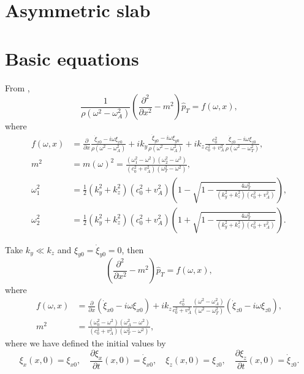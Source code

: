 \documentclass[12pt]{../style-files/ociamthesis}
\begin{document}
\section{Asymmetric slab}
\label{sec: IVP slab}


\section{Basic equations}
From \cite{and_etal07},
\begin{equation}
\frac{1}{\rho(\omega^2 - \omega_A^2)} \left( \frac{\partial^2}{\partial x^2} - m^2 \right) \hat{p}_T = f(\omega, x),
\end{equation}
where
\begin{align}
f(\omega, x) &= \frac{\partial}{\partial x} \frac{\dot{\xi}_{x0} - i\omega\xi_{x0}}{\rho(\omega^2 - \omega_A^2)} + ik_y \frac{\dot{\xi}_{y0} - i\omega\xi_{y0}}{\rho(\omega^2 - \omega_A^2)} + ik_z \frac{c_0^2}{c_0^2 + v_A^2} \frac{\dot{\xi}_{z0} - i\omega\xi_{z0}}{\rho(\omega^2 - \omega_T^2)}, \\
m^2 &= m(\omega)^2 = \frac{(\omega_1^2 - \omega^2)(\omega_2^2 - \omega^2)}{(c_0^2 + v_A^2)(\omega_T^2 - \omega^2)}, \\
\omega_1^2 &= \frac{1}{2}(k_y^2 + k_z^2)(c_0^2 + v_A^2) \left( 1 - \sqrt{1 - \frac{4\omega_T^2}{(k_y^2 + k_z^2)(c_0^2 + v_A^2)}} \right), \\
\omega_2^2 &= \frac{1}{2}(k_y^2 + k_z^2)(c_0^2 + v_A^2) \left( 1 + \sqrt{1 - \frac{4\omega_T^2}{(k_y^2 + k_z^2)(c_0^2 + v_A^2)}} \right).
\end{align}

Take $k_y \ll k_z$ and $\xi_{y0} = \dot{\xi}_{y0} = 0$, then
\begin{equation}
\left( \frac{\partial^2}{\partial x^2} - m^2 \right) \hat{p}_T = f(\omega, x),
\end{equation}
where
\begin{align}
f(\omega, x) &= \frac{\partial}{\partial x} (\dot{\xi}_{x0} - i\omega\xi_{x0}) + ik_z \frac{c_0^2}{c_0^2 + v_A^2} \frac{(\omega^2 - \omega_A^2)}{(\omega^2 - \omega_T^2)} (\dot{\xi}_{z0} - i\omega\xi_{z0}), \\
m^2 &= \frac{(\omega_0^2 - \omega^2)(\omega_A^2 - \omega^2)}{(c_0^2 + v_A^2)(\omega_T^2 - \omega^2)},
\end{align}
where we have defined the initial values by
\begin{equation}
\xi_x(x, 0) = \xi_{x0}, \quad \frac{\partial{}\xi_x}{\partial{t}}(x, 0) = \dot{\xi}_{x0}, \quad \xi_z(x, 0) = \xi_{z0}, \quad \frac{\partial{}\xi_z}{\partial{t}}(x, 0) = \dot{\xi}_{z0}.
\end{equation}
\end{document}
